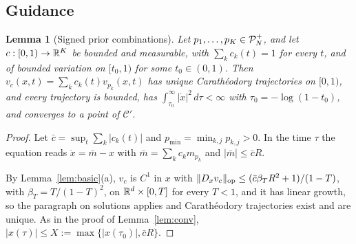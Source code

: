 \documentclass{article} %
\theoremstyle{plain}
\newtheorem{lemma}[theorem]{Lemma}
\theoremstyle{definition}
\theoremstyle{remark}
\begin{document}
\subsection{Guidance}
\label{apx:pf-guidance}

\begin{lemma}[Signed prior combinations]
\label{lem:signedconv}
Let $p_1,\dots,p_K\in\mathcal{P}_N^{+}$, and let $c:[0,1)\to\mathbb{R}^K$ be bounded and measurable, with
$\sum_kc_k(t)=1$ for every $t$, and of bounded variation on $[t_0,1)$ for some
$t_0\in(0,1)$. Then $v_c(x,t)=\sum_kc_k(t)v_{p_k}(x,t)$ has unique Carath\'eodory
trajectories on $[0,1)$, and every trajectory is bounded, has
$\int_{\tau_0}^\infty|\dot x|^2\,d\tau<\infty$ with $\tau_0=-\log(1-t_0)$, and converges to a
point of $\mathcal C'$.
\end{lemma}
\begin{proof}
Let $\bar c=\sup_t\sum_k|c_k(t)|$ and $p_{\min}=\min_{k,j}p_{k,j}>0$. In the time $\tau$ the
equation reads $\dot x=\bar m-x$ with $\bar m=\sum_kc_km_{p_k}$ and $|\bar m|\le\bar cR$.

By Lemma~\ref{lem:basic}(a), $v_c$ is $C^1$ in $x$ with
$\|D_xv_c\|_{\rm op}\le(\bar c\beta_TR^2+1)/(1-T)$, with $\beta_T=T/(1-T)^2$, on $\mathbb{R}^d\times[0,T]$
for every $T<1$, and it has
linear growth, so the paragraph on solutions applies and Carath\'eodory trajectories exist and are
unique. As in the proof of Lemma~\ref{lem:conv}, $|x(\tau)|\le X:=\max\{|x(\tau_0)|,\bar cR\}$.


\end{proof}
\end{document}
